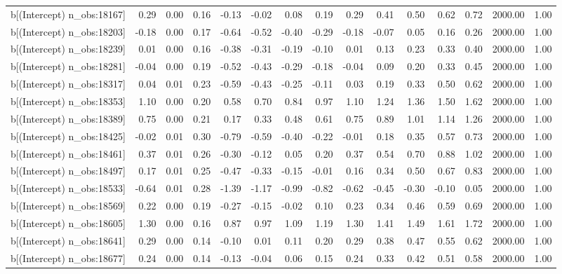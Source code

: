\begin{table}[ht]
\begin{tabular}{rrrrrrrrrrrrrrr}
  b[(Intercept) n\_obs:18167] & 0.29 & 0.00 & 0.16 & -0.13 & -0.02 & 0.08 & 0.19 & 0.29 & 0.41 & 0.50 & 0.62 & 0.72 & 2000.00 & 1.00 \\ 
  b[(Intercept) n\_obs:18203] & -0.18 & 0.00 & 0.17 & -0.64 & -0.52 & -0.40 & -0.29 & -0.18 & -0.07 & 0.05 & 0.16 & 0.26 & 2000.00 & 1.00 \\ 
  b[(Intercept) n\_obs:18239] & 0.01 & 0.00 & 0.16 & -0.38 & -0.31 & -0.19 & -0.10 & 0.01 & 0.13 & 0.23 & 0.33 & 0.40 & 2000.00 & 1.00 \\ 
  b[(Intercept) n\_obs:18281] & -0.04 & 0.00 & 0.19 & -0.52 & -0.43 & -0.29 & -0.18 & -0.04 & 0.09 & 0.20 & 0.33 & 0.45 & 2000.00 & 1.00 \\ 
  b[(Intercept) n\_obs:18317] & 0.04 & 0.01 & 0.23 & -0.59 & -0.43 & -0.25 & -0.11 & 0.03 & 0.19 & 0.33 & 0.50 & 0.62 & 2000.00 & 1.00 \\ 
  b[(Intercept) n\_obs:18353] & 1.10 & 0.00 & 0.20 & 0.58 & 0.70 & 0.84 & 0.97 & 1.10 & 1.24 & 1.36 & 1.50 & 1.62 & 2000.00 & 1.00 \\ 
  b[(Intercept) n\_obs:18389] & 0.75 & 0.00 & 0.21 & 0.17 & 0.33 & 0.48 & 0.61 & 0.75 & 0.89 & 1.01 & 1.14 & 1.26 & 2000.00 & 1.00 \\ 
  b[(Intercept) n\_obs:18425] & -0.02 & 0.01 & 0.30 & -0.79 & -0.59 & -0.40 & -0.22 & -0.01 & 0.18 & 0.35 & 0.57 & 0.73 & 2000.00 & 1.00 \\ 
  b[(Intercept) n\_obs:18461] & 0.37 & 0.01 & 0.26 & -0.30 & -0.12 & 0.05 & 0.20 & 0.37 & 0.54 & 0.70 & 0.88 & 1.02 & 2000.00 & 1.00 \\ 
  b[(Intercept) n\_obs:18497] & 0.17 & 0.01 & 0.25 & -0.47 & -0.33 & -0.15 & -0.01 & 0.16 & 0.34 & 0.50 & 0.67 & 0.83 & 2000.00 & 1.00 \\ 
  b[(Intercept) n\_obs:18533] & -0.64 & 0.01 & 0.28 & -1.39 & -1.17 & -0.99 & -0.82 & -0.62 & -0.45 & -0.30 & -0.10 & 0.05 & 2000.00 & 1.00 \\ 
  b[(Intercept) n\_obs:18569] & 0.22 & 0.00 & 0.19 & -0.27 & -0.15 & -0.02 & 0.10 & 0.23 & 0.34 & 0.46 & 0.59 & 0.69 & 2000.00 & 1.00 \\ 
  b[(Intercept) n\_obs:18605] & 1.30 & 0.00 & 0.16 & 0.87 & 0.97 & 1.09 & 1.19 & 1.30 & 1.41 & 1.49 & 1.61 & 1.72 & 2000.00 & 1.00 \\ 
  b[(Intercept) n\_obs:18641] & 0.29 & 0.00 & 0.14 & -0.10 & 0.01 & 0.11 & 0.20 & 0.29 & 0.38 & 0.47 & 0.55 & 0.62 & 2000.00 & 1.00 \\ 
  b[(Intercept) n\_obs:18677] & 0.24 & 0.00 & 0.14 & -0.13 & -0.04 & 0.06 & 0.15 & 0.24 & 0.33 & 0.42 & 0.51 & 0.58 & 2000.00 & 1.00 \\ 

\end{tabular}
\end{table}
